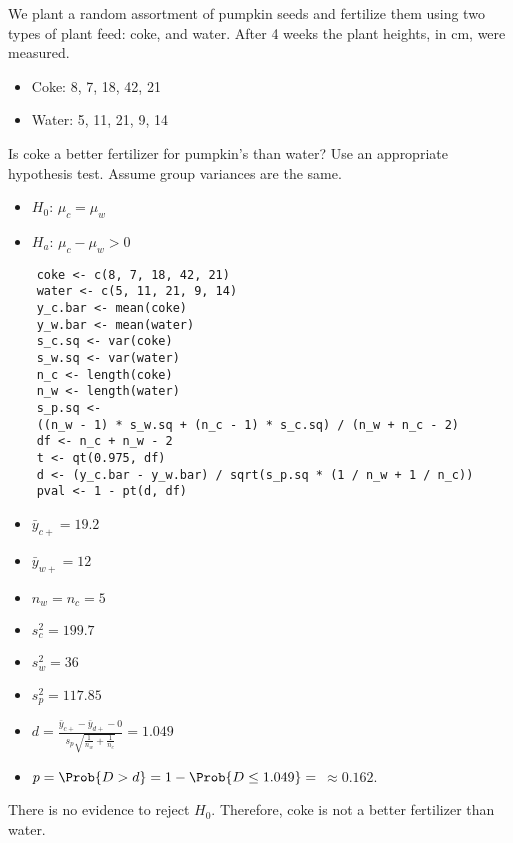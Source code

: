 \begin{Example}{}{}
    We plant a random assortment of pumpkin seeds and fertilize them using two types of plant
    feed: coke, and water. After 4 weeks the plant heights, in cm, were measured.
    \begin{itemize}
        \item Coke: 8, 7, 18, 42, 21
        \item Water: 5, 11, 21, 9, 14
    \end{itemize}
    Is coke a better fertilizer for pumpkin’s than water? Use an appropriate hypothesis test.
    Assume group variances are the same.
    \begin{itemize}
        \item $ H_0 $: $ \mu_c=\mu_w $
        \item $ H_a $: $ \mu_c-\mu_w>0 $
    \end{itemize}
    \begin{verbatim}
    coke <- c(8, 7, 18, 42, 21)
    water <- c(5, 11, 21, 9, 14)
    y_c.bar <- mean(coke)
    y_w.bar <- mean(water)
    s_c.sq <- var(coke)
    s_w.sq <- var(water)
    n_c <- length(coke)
    n_w <- length(water)
    s_p.sq <-
    ((n_w - 1) * s_w.sq + (n_c - 1) * s_c.sq) / (n_w + n_c - 2)
    df <- n_c + n_w - 2
    t <- qt(0.975, df)
    d <- (y_c.bar - y_w.bar) / sqrt(s_p.sq * (1 / n_w + 1 / n_c))
    pval <- 1 - pt(d, df)
    \end{verbatim}
    \begin{itemize}
        \item $ \bar{y}_{c+}=19.2 $
        \item $ \bar{y}_{w+}=12 $
        \item $ n_w=n_c=5 $
        \item $ s_c^2=199.7 $
        \item $ s_w^2=36 $
        \item $ s_p^2=117.85 $
        \item $ \displaystyle d=\frac{\bar{y}_{c+}-\bar{y}_{d+}-0}{s_p\sqrt{\frac{1}{n_w} +\frac{1}{n_c} }}=1.049 $
        \item $ p=\Prob{D>d}=1-\Prob{D\le 1.049}=$  $\approx 0.162$.
    \end{itemize}
    There is no evidence to reject $ H_0 $. Therefore, coke is not a
    better fertilizer than water.
\end{Example}
